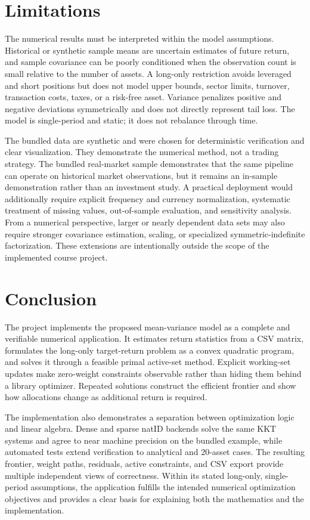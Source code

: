 \documentclass[conference]{IEEEtran}
\begin{document}
\section{Limitations}

The numerical results must be interpreted within the model assumptions.
Historical or synthetic sample means are uncertain estimates of future return,
and sample covariance can be poorly conditioned when the observation count is
small relative to the number of assets. A long-only restriction avoids
leveraged and short positions but does not model upper bounds, sector limits,
turnover, transaction costs, taxes, or a risk-free asset. Variance penalizes
positive and negative deviations symmetrically and does not directly represent
tail loss. The model is single-period and static; it does not rebalance through
time.

The bundled data are synthetic and were chosen for deterministic verification
and clear visualization. They demonstrate the numerical method, not a trading
strategy. The bundled real-market sample demonstrates that the same pipeline can operate
on historical market observations, but it remains an in-sample demonstration
rather than an investment study. A practical deployment would additionally
require explicit frequency and currency normalization, systematic treatment of
missing values, out-of-sample evaluation, and sensitivity analysis. From a numerical
perspective, larger or nearly dependent data sets may also require stronger
covariance estimation, scaling, or specialized symmetric-indefinite
factorization. These extensions are intentionally outside the scope of the
implemented course project.

\section{Conclusion}

The project implements the proposed mean-variance model as a complete and
verifiable numerical application. It estimates return statistics from a CSV
matrix, formulates the long-only target-return problem as a convex quadratic
program, and solves it through a feasible primal active-set method. Explicit
working-set updates make zero-weight constraints observable rather than hiding
them behind a library optimizer. Repeated solutions construct the efficient
frontier and show how allocations change as additional return is required.

The implementation also demonstrates a separation between optimization logic
and linear algebra. Dense and sparse natID backends solve the same KKT systems
and agree to near machine precision on the bundled example, while automated
tests extend verification to analytical and 20-asset cases. The resulting
frontier, weight paths, residuals, active constraints, and CSV export provide
multiple independent views of correctness. Within its stated long-only,
single-period assumptions, the application fulfills the intended numerical
optimization objectives and provides a clear basis for explaining both the
mathematics and the implementation.
\end{document}
